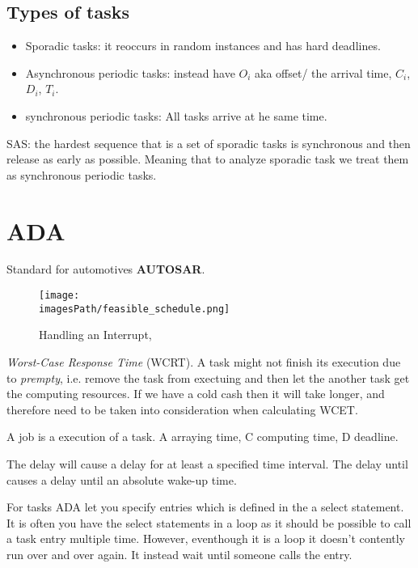 \subsection{Types of tasks}
\begin{itemize}
  \item Sporadic tasks: it reoccurs in random instances and has hard deadlines.%
  \item Asynchronous periodic tasks: instead have $O_i$ aka offset/ the arrival time, $C_i$, $D_i$, $T_i$.
  \item synchronous periodic tasks: All tasks arrive at he same time.
\end{itemize}
SAS: the hardest sequence that is a set of sporadic tasks is synchronous and then release as early as possible.
Meaning that to analyze sporadic task we treat them as synchronous periodic tasks.


\section{ADA}
Standard for automotives \textbf{AUTOSAR}.


\begin{figure}[H]
    \centering
    \texttt{[image: \\imagesPath/feasible\_schedule.png]}
    \caption{Handling an Interrupt, \cite{RTOS, p.29}}
\end{figure}


\textit{Worst-Case Response Time} (WCRT). A task might not finish its execution due to \textit{prempty}, i.e. remove the task from exectuing and then let the another task get the computing resources. 
If we have a cold cash then it will take longer, and therefore need to be taken into consideration when calculating WCET.

A job is a execution of a task. A arraying time, C computing time, D deadline.

The delay will cause a delay for at least a specified time interval. The delay until causes a delay until an absolute wake-up time.

For tasks ADA let you specify entries which is defined in the a select statement.
It is often you have the select statements in a loop as it should be possible to call
a task entry multiple time. However, eventhough it is a loop it doesn't contently run over and over again.
It instead wait until someone calls the entry.


